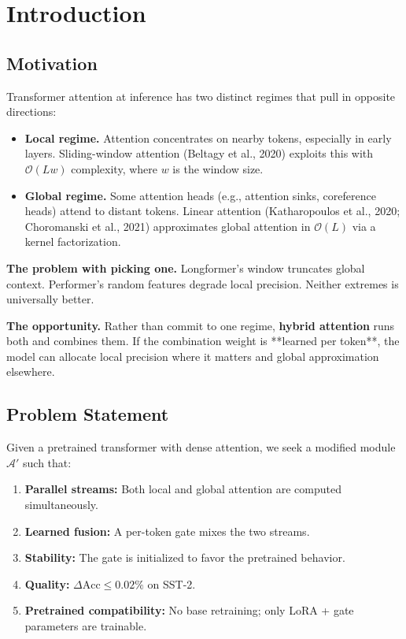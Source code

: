 
\section{Introduction}

\subsection{Motivation}

Transformer attention at inference has two distinct regimes that pull in 
opposite directions:

\begin{itemize}
\item \textbf{Local regime.} Attention concentrates on nearby tokens, especially in
  early layers. Sliding-window attention (Beltagy et al., 2020) exploits this
  with $\mathcal{O}(L w)$ complexity, where $w$ is the window size.

\item \textbf{Global regime.} Some attention heads (e.g., attention sinks, coreference
  heads) attend to distant tokens. Linear attention (Katharopoulos et al.,
  2020; Choromanski et al., 2021) approximates global attention in
  $\mathcal{O}(L)$ via a kernel factorization.

\end{itemize}
\textbf{The problem with picking one.} Longformer's window truncates global 
context. Performer's random features degrade local precision. Neither 
extremes is universally better.

\textbf{The opportunity.} Rather than commit to one regime, \textbf{hybrid attention} 
runs both and combines them. If the combination weight is **learned per 
token**, the model can allocate local precision where it matters and global 
approximation elsewhere.

\subsection{Problem Statement}

Given a pretrained transformer with dense attention, we seek a modified 
module $\mathcal{A}'$ such that:

\begin{enumerate}
\item \textbf{Parallel streams:} Both local and global attention are computed
  simultaneously.
\item \textbf{Learned fusion:} A per-token gate mixes the two streams.
\item \textbf{Stability:} The gate is initialized to favor the pretrained behavior.
\item \textbf{Quality:} $\Delta\text{Acc} \leq 0.02\%$ on SST-2.
\item \textbf{Pretrained compatibility:} No base retraining; only LoRA + gate
  parameters are trainable.

\end{enumerate}
